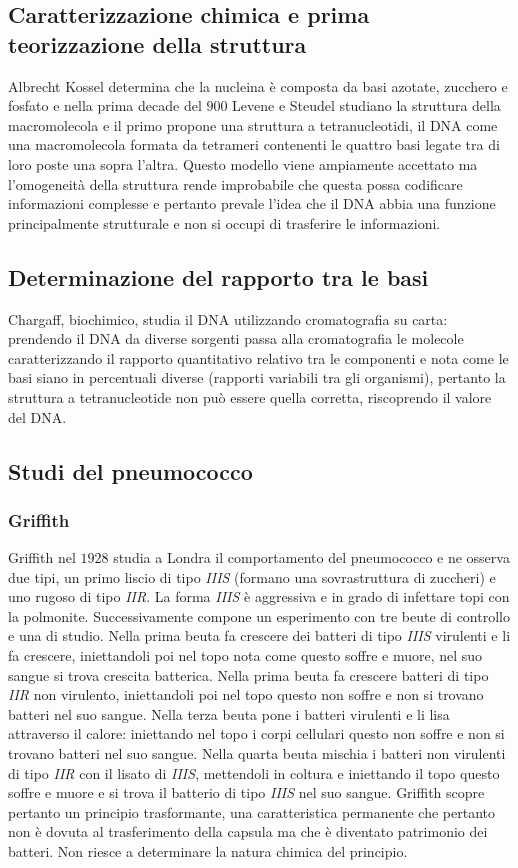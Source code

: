 \subsection{Caratterizzazione chimica e prima teorizzazione della struttura}
Albrecht Kossel determina che la nucleina \`e composta da basi azotate, zucchero e fosfato e nella prima decade del $900$ Levene e Steudel studiano la struttura della macromolecola e 
il primo propone una struttura a tetranucleotidi, il DNA come una macromolecola formata da tetrameri contenenti le quattro basi legate tra di loro poste una sopra l'altra. Questo modello
viene ampiamente accettato ma l'omogeneit\`a della struttura rende improbabile che questa possa codificare informazioni complesse e pertanto prevale l'idea che il DNA abbia una funzione
principalmente strutturale e non si occupi di trasferire le informazioni. 
\subsection{Determinazione del rapporto tra le basi}
Chargaff, biochimico, studia il DNA utilizzando cromatografia su carta: prendendo il DNA da diverse sorgenti passa alla cromatografia le molecole caratterizzando il rapporto quantitativo
relativo tra le componenti e nota come le basi siano in percentuali diverse (rapporti variabili tra gli organismi), pertanto la struttura a tetranucleotide non pu\`o essere quella 
corretta, riscoprendo il valore del DNA. 
\subsection{Studi del pneumococco}
\subsubsection{Griffith}
Griffith nel $1928$ studia a Londra il comportamento del pneumococco e ne osserva due tipi, un primo liscio di tipo \emph{IIIS} (formano una sovrastruttura di zuccheri) e uno rugoso di tipo 
\emph{IIR}. La forma \emph{IIIS} \`e aggressiva e in grado di infettare topi con la polmonite. Successivamente compone un esperimento con tre beute di controllo e una di studio. Nella prima beuta
fa crescere dei batteri di tipo \emph{IIIS} virulenti e li fa crescere, iniettandoli poi nel topo nota come questo soffre e muore, nel suo sangue si trova crescita batterica. Nella prima 
beuta fa crescere batteri di tipo \emph{IIR} non virulento, iniettandoli poi nel topo questo non soffre e non si trovano batteri nel suo sangue. Nella terza beuta pone i batteri virulenti e
li lisa attraverso il calore: iniettando nel topo i corpi cellulari questo non soffre e non si trovano batteri nel suo sangue. Nella quarta beuta mischia i batteri non virulenti di 
tipo \emph{IIR} con il lisato di \emph{IIIS}, mettendoli in coltura e iniettando il topo questo soffre e muore e si trova il batterio di tipo \emph{IIIS} nel suo sangue. Griffith scopre pertanto un 
principio trasformante, una caratteristica permanente che pertanto non \`e dovuta al trasferimento della capsula ma che \`e diventato patrimonio dei batteri. Non riesce a determinare
la natura chimica del principio.
